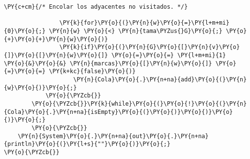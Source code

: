 \begin{Verbatim}[commandchars=\\\{\}]
			    \PY{c+cm}{/* Encolar los adyacentes no visitados. */}

			    \PY{k}{for}\PY{o}{(}\PY{n}{w}\PY{o}{=}\PY{l+m+mi}{0}\PY{o}{;} \PY{n}{w} \PY{o}{<} \PY{n}{tama\PYZus{}G}\PY{o}{;} \PY{o}{+}\PY{o}{+}\PY{n}{w}\PY{o}{)}
				\PY{k}{if}\PY{o}{(}\PY{n}{G}\PY{o}{[}\PY{n}{v}\PY{o}{]}\PY{o}{[}\PY{n}{w}\PY{o}{]} \PY{o}{=}\PY{o}{=} \PY{l+m+mi}{1} \PY{o}{&}\PY{o}{&} \PY{n}{marcas}\PY{o}{[}\PY{n}{w}\PY{o}{]} \PY{o}{=}\PY{o}{=} \PY{k+kc}{false}\PY{o}{)}
				    \PY{n}{Cola}\PY{o}{.}\PY{n+na}{add}\PY{o}{(}\PY{n}{w}\PY{o}{)}\PY{o}{;}
			\PY{o}{\PYZcb{}}
		\PY{o}{\PYZcb{}}\PY{k}{while}\PY{o}{(}\PY{o}{!}\PY{o}{(}\PY{n}{Cola}\PY{o}{.}\PY{n+na}{isEmpty}\PY{o}{(}\PY{o}{)}\PY{o}{)}\PY{o}{)}\PY{o}{;}
	    \PY{o}{\PYZcb{}}
    \PY{n}{System}\PY{o}{.}\PY{n+na}{out}\PY{o}{.}\PY{n+na}{println}\PY{o}{(}\PY{l+s}{""}\PY{o}{)}\PY{o}{;}
\PY{o}{\PYZcb{}}
\end{Verbatim}
